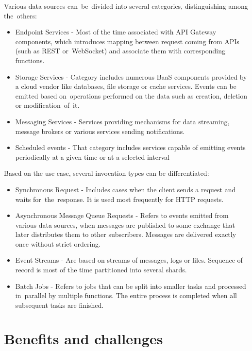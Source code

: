 Various data sources can~be~divided into several categories, distinguishing among the~others:

\begin{itemize}
    \item Endpoint Services - Most of the time associated with API Gateway components, which introduces mapping between request coming from APIs (such as REST or~WebSocket) and associate them with corresponding functions.
    \item Storage Services - Category includes numerous BaaS components provided by a cloud vendor like databases, file storage or cache services. Events can be emitted based on~operations performed on the data such as creation, deletion or modification~of~it.
    \item Messaging Services - Services providing mechanisms for data streaming, message brokers or various services sending notifications.
    \item Scheduled events - That category includes services capable of emitting events periodically at a given time or at a selected interval
\end{itemize}

Based on the use case, several invocation types can be differentiated:

\begin{itemize}
    \item Synchronous Request - Includes cases when the client sends a request and waits for~the~response. It is used most frequently for HTTP requests.
    \item Asynchronous Message Queue Requests - Refers to events emitted from various data sources, when messages are published to some exchange that later distributes them to other subscribers. Messages are delivered exactly once without strict ordering.
    \item Event Streams - Are based on streams of messages, logs or files. Sequence of record is most of the time partitioned into several shards.
    \item Batch Jobs - Refers to jobs that can be split into smaller tasks and processed in~parallel by multiple functions. The entire process is completed when all subsequent tasks are finished.
\end{itemize}

\section{Benefits and challenges} \label{chapter:serverless-benefits-and-challenges}

